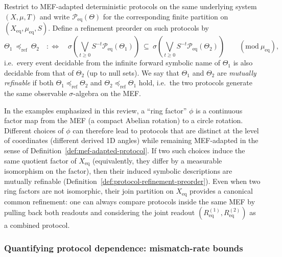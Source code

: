 \begin{definition}\label{def:protocol-refinement-preorder}
Restrict to MEF-adapted deterministic protocols on the same underlying system $(X,\mu,T)$ and write $\mathcal{P}_{\mathrm{eq}}(\Theta)$ for the corresponding finite partition on $(X_{\mathrm{eq}},\mu_{\mathrm{eq}},S)$.
Define a refinement preorder on such protocols by
\[
\Theta_1\ \preceq_{\mathrm{ref}}\ \Theta_2
\quad:\Longleftrightarrow\quad
\sigma\!\left(\bigvee_{t\ge 0} S^{-t}\mathcal{P}_{\mathrm{eq}}(\Theta_1)\right)
\ \subseteq\
\sigma\!\left(\bigvee_{t\ge 0} S^{-t}\mathcal{P}_{\mathrm{eq}}(\Theta_2)\right)
\qquad (\mathrm{mod}\ \mu_{\mathrm{eq}}),
\]
i.e.\ every event decidable from the infinite forward symbolic name of $\Theta_1$ is also decidable from that of $\Theta_2$ (up to null sets).
We say that $\Theta_1$ and $\Theta_2$ are \emph{mutually refinable} if both $\Theta_1\preceq_{\mathrm{ref}}\Theta_2$ and $\Theta_2\preceq_{\mathrm{ref}}\Theta_1$ hold, i.e.\ the two protocols generate the same observable $\sigma$-algebra on the MEF.
\end{definition}

\begin{remark}\label{rem:phi-same-mef}
In the examples emphasized in this review, a ``ring factor'' $\phi$ is a continuous factor map from the MEF (a compact Abelian rotation) to a circle rotation.
Different choices of $\phi$ can therefore lead to protocols that are distinct at the level of coordinates (different derived 1D angles) while remaining MEF-adapted in the sense of Definition~\ref{def:mef-adapted-protocol}.
If two such choices induce the same quotient factor of $X_{\mathrm{eq}}$ (equivalently, they differ by a measurable isomorphism on the factor), then their induced symbolic descriptions are mutually refinable (Definition~\ref{def:protocol-refinement-preorder}).
Even when two ring factors are not isomorphic, their join partition on $X_{\mathrm{eq}}$ provides a canonical common refinement: one can always compare protocols inside the same MEF by pulling back both readouts and considering the joint readout $(R_{\mathrm{eq}}^{(1)},R_{\mathrm{eq}}^{(2)})$ as a combined protocol.
\end{remark}

\subsubsection{Quantifying protocol dependence: mismatch-rate bounds}\label{sec:info-time:stability-bounds}

